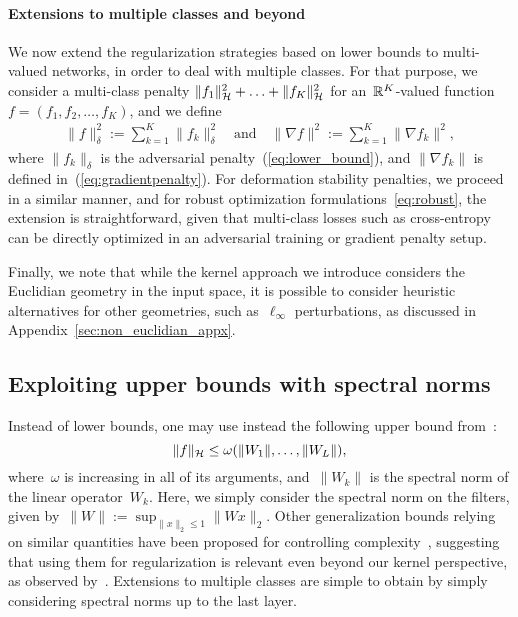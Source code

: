 \paragraph{Extensions to multiple classes and beyond}
\label{sub:multiclass}

We now extend the regularization strategies based on lower bounds to multi-valued networks,
in order to deal with multiple classes.
For that purpose, we consider a multi-class penalty $\|f_1\|_{\mathcal H}^2 + \ldots + \|f_K\|_{\mathcal H}^2$
for an~${\mathbb R}^K$-valued function $f = (f_1, f_2, \ldots, f_K)$, and we define 
\begin{align*}
\|f\|_\delta^2 := \sum_{k=1}^K \|f_k\|_\delta^2 \text{~~~and~~~} \|\nabla f\|^2 := \sum_{k=1}^K \|\nabla f_k\|^2,
\end{align*}
where $\|f_k\|_\delta$ is the adversarial penalty~(\ref{eq:lower_bound}), and $\|\nabla f_k\|$ is defined in~(\ref{eq:gradientpenalty}).
For deformation stability penalties, we proceed in a similar manner,
and for robust optimization formulations~\eqref{eq:robust}, the extension is straightforward,
given that multi-class losses such as cross-entropy can be
directly optimized in an adversarial training or gradient penalty setup.

Finally, we note that while the kernel approach we introduce considers
the Euclidian geometry in the input space, it is possible to consider heuristic alternatives for other
geometries, such as~$\ell_\infty$ perturbations, as discussed in Appendix~\ref{sec:non_euclidian_appx}.

\subsection{Exploiting upper bounds with spectral norms}
\label{sub:upper_bounds}

Instead of lower bounds, one may use instead
 the following upper bound from~\citet[Proposition 14]{bietti2018group}:
\begin{equation}
\label{eq:upper_bound}
\|f\|_{\mathcal H} \leq \omega(\|W_1\|, \ldots, \|W_L\|),
\end{equation}
where~$\omega$ is increasing in all of its arguments, and~$\|W_k\|$ is the spectral norm of the linear
operator~$W_k$.
Here, we simply consider the spectral norm on the filters, given by~$\|W\| := \sup_{\|x\|_2 \leq 1} \|W x\|_2$.
Other generalization bounds relying on similar quantities have been proposed for
controlling complexity~\citep{bartlett2017spectrally,neyshabur2017pac}, suggesting that using them for
regularization is relevant even beyond our kernel perspective,
as observed by~\citet{cisse2017parseval,sedghi2018singular,yoshida2017spectral}.
Extensions to multiple classes are simple to obtain by simply considering spectral norms up to
the last layer.


